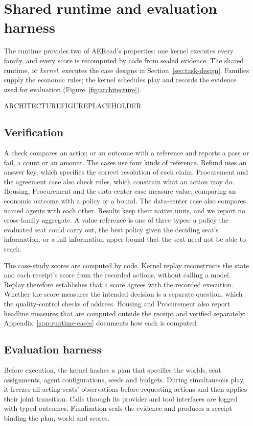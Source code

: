 \section{Shared runtime and evaluation harness}
\label{sec:runtime}
\label{sec:measurement}

The runtime provides two of AERead's properties: one kernel executes every
family, and every score is recomputed by code from sealed evidence. The
shared runtime, or \emph{kernel}, executes the case designs in
Section~\ref{sec:task-design}. Families supply the economic rules;
the kernel schedules play and records the evidence used for evaluation
(Figure~\ref{fig:architecture}).

ARCHITECTUREFIGUREPLACEHOLDER

\subsection{Verification}
A check compares an action or an outcome with a reference and reports a pass
or fail, a count or an amount. The cases use four kinds of reference. Refund
uses an answer key, which specifies the correct resolution of each claim.
Procurement and the agreement case also check rules, which constrain what
an action may do. Housing, Procurement and the data-center case measure value,
comparing an economic outcome with a policy or a bound. The data-center case also compares named agents
with each other. Results keep their native units, and we report no
cross-family aggregate. A value reference is one of three types: a policy
the evaluated seat could carry out, the best policy given the deciding
seat's information, or a full-information upper bound that the seat need
not be able to reach.

The case-study scores are computed by code. Kernel replay reconstructs
the state and each receipt's score from the recorded actions, without
calling a model. Replay therefore establishes that a score agrees with the
recorded execution. Whether the score measures the intended decision is a
separate question, which the quality-control checks of \qcref{} address.
Housing and Procurement also report headline measures that are computed
outside the receipt and verified separately; Appendix~\ref{app:runtime-cases}
documents how each is computed.

\subsection{Evaluation harness}
Before execution, the kernel hashes a plan that specifies the worlds, seat
assignments, agent configurations, seeds and budgets. During simultaneous
play, it freezes all acting seats' observations before requesting actions
and then applies their joint transition. Calls through its provider and
tool interfaces are logged with typed outcomes. Finalization seals the
evidence and produces a receipt binding the plan, world and scores.

